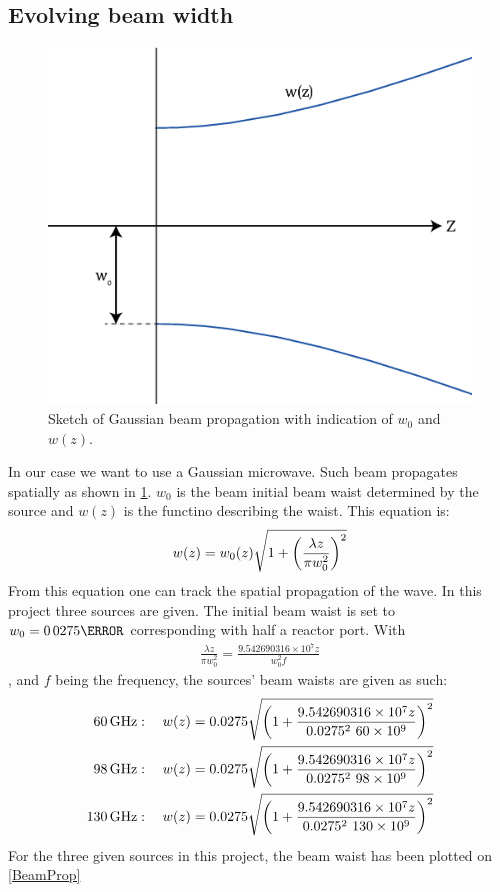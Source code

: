 \subsection{Evolving beam width}
\begin{figure}
	\vspace{-5mm}
	\includegraphics[width=.4\textwidth]{Figures/PropEx.eps}
	\caption{Sketch of Gaussian beam propagation with indication of \(w_0\) and \(w(z)\).}
	\label{PropEx}
\end{figure}
In our case we want to use a Gaussian microwave. Such beam propagates spatially as shown in \cref{PropEx}.
\(w_0\) is the beam initial beam waist determined by the source and \(w(z)\) is the functino describing the waist. This equation is:
\begin{align}
	w(z) = w_0(z)\sqrt{1+\pqty{\frac{\lambda z}{\pi w_0^2}}^2}\label{wz}
\end{align}
From this equation one can track the spatial propagation of the wave. In this project three sources are given. The initial beam waist is set to \(w_0=\si{0.0275}{\meter}\) corresponding with half a reactor port. With
\begin{align}
	\frac{\lambda z}{\pi w_0^2} = \frac{9.542690316\times10^7 z}{w_0^2 f}
\end{align}
, and \(f\) being the frequency, the sources' beam waists are given as such:
\begin{align}
	\SI{60}{\giga\hertz}  & : \quad w(z)=0.0275\sqrt{\pqty{1+\frac{9.542690316\times10^7 z}{0.0275^2 \ 60\times10^9}}^2}\label{60}   \\
	\SI{98}{\giga\hertz}  & : \quad w(z)=0.0275\sqrt{\pqty{1+\frac{9.542690316\times10^7 z}{0.0275^2 \ 98\times10^9}}^2}\label{98}   \\
	\SI{130}{\giga\hertz} & : \quad w(z)=0.0275\sqrt{\pqty{1+\frac{9.542690316\times10^7 z}{0.0275^2 \ 130\times10^9}}^2}\label{130}
\end{align}
For the three given sources in this project, the beam waist has been plotted on \cref{BeamProp}
\newline

